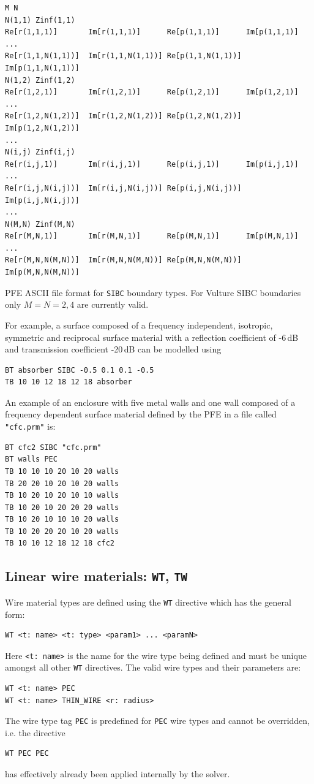 \documentclass[onecolumn,a4paper]{article}
\numberwithin{equation}{section}
\begin{document}
\begin{table}[ht]
\begin{Verbatim}[frame=single]
M N
N(1,1) Zinf(1,1)
Re[r(1,1,1)]       Im[r(1,1,1)]      Re[p(1,1,1)]      Im[p(1,1,1)]
...
Re[r(1,1,N(1,1))]  Im[r(1,1,N(1,1))] Re[p(1,1,N(1,1))] Im[p(1,1,N(1,1))]
N(1,2) Zinf(1,2)
Re[r(1,2,1)]       Im[r(1,2,1)]      Re[p(1,2,1)]      Im[p(1,2,1)]
...
Re[r(1,2,N(1,2))]  Im[r(1,2,N(1,2))] Re[p(1,2,N(1,2))] Im[p(1,2,N(1,2))]
...
N(i,j) Zinf(i,j)
Re[r(i,j,1)]       Im[r(i,j,1)]      Re[p(i,j,1)]      Im[p(i,j,1)]
...
Re[r(i,j,N(i,j))]  Im[r(i,j,N(i,j))] Re[p(i,j,N(i,j))] Im[p(i,j,N(i,j))]
...
N(M,N) Zinf(M,N)
Re[r(M,N,1)]       Im[r(M,N,1)]      Re[p(M,N,1)]      Im[p(M,N,1)]
...
Re[r(M,N,N(M,N))]  Im[r(M,N,N(M,N))] Re[p(M,N,N(M,N))] Im[p(M,N,N(M,N))]
\end{Verbatim}
\caption{\label{tb:prm} PFE ASCII file format for \texttt{SIBC} boundary types. For Vulture 
SIBC boundaries only $M=N=2,4$ are currently valid.}
\end{table}

For example,  a surface composed of a frequency independent, isotropic, symmetric and
reciprocal surface material with a reflection coefficient of -6\,dB and
transmission coefficient -20\,dB can be modelled using
\begin{verbatim}
BT absorber SIBC -0.5 0.1 0.1 -0.5
TB 10 10 12 18 12 18 absorber
\end{verbatim}

An example of an enclosure with five metal walls and one wall composed of a 
frequency dependent surface material defined by the PFE in a file 
called \texttt{"cfc.prm"} is:
\begin{verbatim}
BT cfc2 SIBC "cfc.prm"
BT walls PEC
TB 10 10 10 20 10 20 walls
TB 20 20 10 20 10 20 walls
TB 10 20 10 20 10 10 walls
TB 10 20 10 20 20 20 walls
TB 10 20 10 10 10 20 walls
TB 10 20 20 20 10 20 walls
TB 10 10 12 18 12 18 cfc2
\end{verbatim}

\subsection{Linear wire materials: \texttt{WT}, \texttt{TW}}

Wire material types are defined using the \texttt{WT} directive which has the general form:
\begin{verbatim}
WT <t: name> <t: type> <param1> ... <paramN>
\end{verbatim}
Here \texttt{<t:~name>} is the name for the wire type being defined and must be unique 
amongst all other \texttt{WT} directives. The valid wire types and their parameters are:
\begin{verbatim}
WT <t: name> PEC
WT <t: name> THIN_WIRE <r: radius>
\end{verbatim}
The wire type tag \texttt{PEC} is predefined for \texttt{PEC} wire types and cannot be overridden, 
i.e. the directive
\begin{verbatim}
WT PEC PEC
\end{verbatim}
has effectively already been applied internally by the solver.
\end{document}
